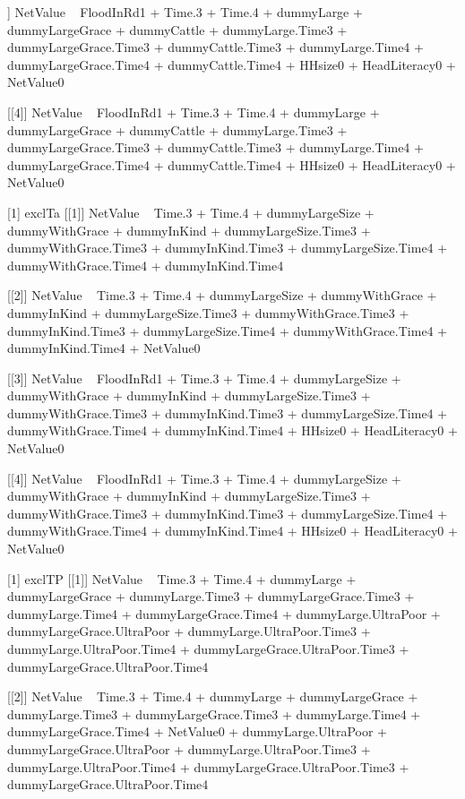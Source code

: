 \begin{Schunk}
\begin{Soutput}
[[3]]
NetValue ~ FloodInRd1 + Time.3 + Time.4 + dummyLarge + dummyLargeGrace + 
    dummyCattle + dummyLarge.Time3 + dummyLargeGrace.Time3 + 
    dummyCattle.Time3 + dummyLarge.Time4 + dummyLargeGrace.Time4 + 
    dummyCattle.Time4 + HHsize0 + HeadLiteracy0 + NetValue0

[[4]]
NetValue ~ FloodInRd1 + Time.3 + Time.4 + dummyLarge + dummyLargeGrace + 
    dummyCattle + dummyLarge.Time3 + dummyLargeGrace.Time3 + 
    dummyCattle.Time3 + dummyLarge.Time4 + dummyLargeGrace.Time4 + 
    dummyCattle.Time4 + HHsize0 + HeadLiteracy0 + NetValue0

[1] exclTa
[[1]]
NetValue ~ Time.3 + Time.4 + dummyLargeSize + dummyWithGrace + 
    dummyInKind + dummyLargeSize.Time3 + dummyWithGrace.Time3 + 
    dummyInKind.Time3 + dummyLargeSize.Time4 + dummyWithGrace.Time4 + 
    dummyInKind.Time4

[[2]]
NetValue ~ Time.3 + Time.4 + dummyLargeSize + dummyWithGrace + 
    dummyInKind + dummyLargeSize.Time3 + dummyWithGrace.Time3 + 
    dummyInKind.Time3 + dummyLargeSize.Time4 + dummyWithGrace.Time4 + 
    dummyInKind.Time4 + NetValue0

[[3]]
NetValue ~ FloodInRd1 + Time.3 + Time.4 + dummyLargeSize + dummyWithGrace + 
    dummyInKind + dummyLargeSize.Time3 + dummyWithGrace.Time3 + 
    dummyInKind.Time3 + dummyLargeSize.Time4 + dummyWithGrace.Time4 + 
    dummyInKind.Time4 + HHsize0 + HeadLiteracy0 + NetValue0

[[4]]
NetValue ~ FloodInRd1 + Time.3 + Time.4 + dummyLargeSize + dummyWithGrace + 
    dummyInKind + dummyLargeSize.Time3 + dummyWithGrace.Time3 + 
    dummyInKind.Time3 + dummyLargeSize.Time4 + dummyWithGrace.Time4 + 
    dummyInKind.Time4 + HHsize0 + HeadLiteracy0 + NetValue0

[1] exclTP
[[1]]
NetValue ~ Time.3 + Time.4 + dummyLarge + dummyLargeGrace + dummyLarge.Time3 + 
    dummyLargeGrace.Time3 + dummyLarge.Time4 + dummyLargeGrace.Time4 + 
    dummyLarge.UltraPoor + dummyLargeGrace.UltraPoor + dummyLarge.UltraPoor.Time3 + 
    dummyLarge.UltraPoor.Time4 + dummyLargeGrace.UltraPoor.Time3 + 
    dummyLargeGrace.UltraPoor.Time4

[[2]]
NetValue ~ Time.3 + Time.4 + dummyLarge + dummyLargeGrace + dummyLarge.Time3 + 
    dummyLargeGrace.Time3 + dummyLarge.Time4 + dummyLargeGrace.Time4 + 
    NetValue0 + dummyLarge.UltraPoor + dummyLargeGrace.UltraPoor + 
    dummyLarge.UltraPoor.Time3 + dummyLarge.UltraPoor.Time4 + 
    dummyLargeGrace.UltraPoor.Time3 + dummyLargeGrace.UltraPoor.Time4


\end{Soutput}
\end{Schunk}
